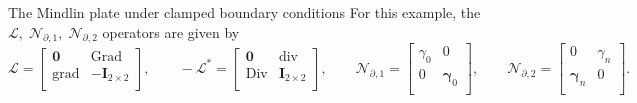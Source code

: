 \documentclass[aspectratio=169]{ISAE-Beamer}
\DeclareMathOperator*{\grad}{grad}
\DeclareMathOperator*{\Grad}{Grad}
\DeclareMathOperator*{\Div}{Div}
\renewcommand{\div}{\operatorname{div}}
\begin{document}
\begin{frame}{The Mindlin plate under clamped boundary conditions}
For this example, the $\mathcal{L}, \; \mathcal{N}_{\partial, 1}, \; \mathcal{N}_{\partial, 2}$ operators are given by
\begin{equation*}
\mathcal{L} = \begin{bmatrix}
\bm{0} & \Grad\\
\grad & -\bm{I}_{2 \times 2}\\
\end{bmatrix}, \qquad
-\mathcal{L}^* = \begin{bmatrix}
\bm{0} & \div\\
\Div & \bm{I}_{2 \times 2}\\
\end{bmatrix}, \qquad
\mathcal{N}_{\partial, 1} = \begin{bmatrix}
\gamma_0 & 0 \\ 
0 &  \bm\gamma_0\\
\end{bmatrix}, \qquad 
\mathcal{N}_{\partial, 2} = \begin{bmatrix}
0 & \gamma_{n}  \\
\bm\gamma_n & 0 \\
\end{bmatrix}.
\end{equation*}

\end{frame}
\end{document}
